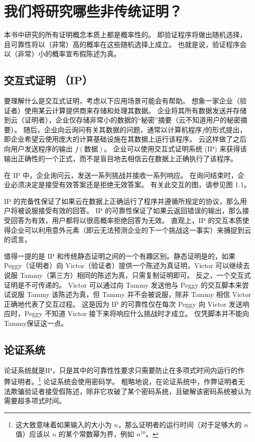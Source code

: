 \section{我们将研究哪些非传统证明？}
本书中研究的所有证明概念本质上都是概率性的。
即验证程序将做出随机选择，且可靠性将以（非常）高的概率在这些随机选择上成立。 
也就是说，验证程序会以（非常）小的概率宣布假陈述为真。

\subsection{交互式证明 （IP）} \label{1.2.1}
要理解什么是交互式证明，考虑以下应用场景可能会有帮助。 想象一家企业（验证者）使用某云计算提供商来存储和处理其数据。 
企业将其所有数据发送并存储到云（证明者），企业仅存储非常小的数据的“秘密”摘要（云不知道用户的秘密摘要）。 
随后，企业向云询问有关其数据的问题，通常以计算机程序$f$的形式提出，即企业希望云使用庞大的计算基础设施在其数据上运行该程序。 
云这样做了之后向用户发送程序的输出 $f(\text{数据})$。 企业可以使用交互式证明系统 (IP) 来获得该输出正确性的一个正式，而不是盲目地去相信云在数据上正确执行了该程序。

在 IP 中，企业询问云，发送一系列挑战并接收一系列响应。 在询问结束时，企业必须决定是接受有效答案还是拒绝无效答案。 有关此交互的图，请参见图 1.1。

IP 的完备性保证了如果云在数据上正确运行了程序并遵循所规定的协议，那么用户将被说服接受有效的回答。 IP 的可靠性保证了如果云返回错误的输出，那么接受回答为有效，用户都将以很高概率拒绝回答为无效。 直观上，IP 的交互本质使得企业可以利用意外元素（即云无法预测企业的下一个挑战这一事实）来捕捉到云的谎言。

值得一提的是 IP 和传统静态证明之间的一个有趣区别。静态证明是的，如果 Peggy（证明者）向 Victor（验证者）提供一个陈述为真证明，Victor 可以继续去说服 Tammy（第三方）相同的陈述为真，只需复制证明即可。 反之，一个交互式证明是不可传递的。 Victor 可以通过向 Tammy 发送他与 Peggy 的交互脚本来尝试说服 Tammy 该陈述为真，但 Tammy 并不会被说服，除非 Tammy 相信 Victor 正确地代表了交互过程。 这是因为 IP 的可靠性仅在每次 Peggy 向 Victor 发送响应时，Peggy 不知道 Victor 接下来将响应什么挑战时才成立。 仅凭脚本并不能向Tammy保证这一点。

\subsection{论证系统} \label{1.2.2}
论证系统就是IP，只是其中的可靠性性要求只需要防止在多项式时间内运行的作弊证明者。\footnote{这大致意味着如果输入的大小为 $n$，那么证明者的运行时间（对于足够大的 $n$ 值）应该以 $n$ 的某个常数幂为界，例如 $n^{10} $。}
论证系统会使用密码学。 
粗略地说，在论证系统中，作弊证明者无法欺骗验证者接受假陈述，除非它攻破了某个密码系统，且破解该密码系统被认为需要超多项式时间。

